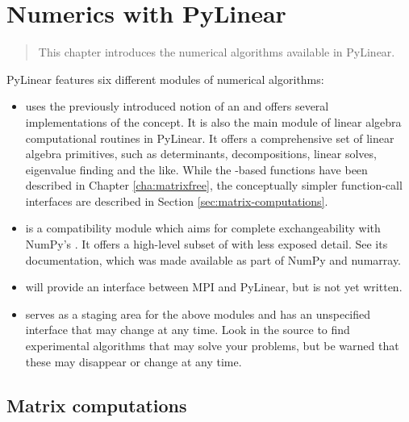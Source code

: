 \chapter{Numerics with PyLinear}
\label{cha:numerics}

\begin{quote}
   This chapter introduces the numerical algorithms available
   in PyLinear.
\end{quote}

PyLinear features six different modules of numerical algorithms:
\begin{itemize}
  \item {} uses the previously introduced 
    notion of an  and offers several implementations 
    of the concept. It is also the main module of linear
    algebra computational routines in PyLinear. It offers a
    comprehensive set of linear algebra primitives, such as
    determinants, decompositions, linear solves, eigenvalue finding
    and the like. While the -based functions have
    been described in Chapter \ref{cha:matrixfree}, the conceptually
    simpler function-call interfaces are described in Section
    \ref{sec:matrix-computations}.
  \item {} is a compatibility module 
    which aims for complete exchangeability with NumPy's .
    It offers a high-level subset of  
    with less exposed detail. See its documentation, which was made
    available as part of NumPy and numarray.
  \item {} will provide an interface between
   MPI and PyLinear, but is not yet written.
  \item {} serves as a staging area for
    the above modules and has an unspecified interface that may 
    change at any time. Look in the source to find experimental
    algorithms that may solve your problems, but be warned that
    these may disappear or change at any time.
\end{itemize}

\section{Matrix computations}

